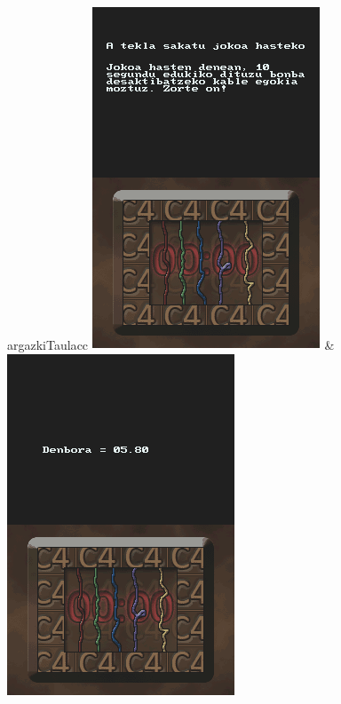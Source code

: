 \documentclass[dvipsnames]{AritzhClass}
\begin{document}
\begin{taula}{}{argazkiTaula}{cc}
\includegraphics[scale=0.75]{Jokoa1} & \includegraphics[scale=0.75]{Jokoa2} \\

\end{taula}
\end{document}
